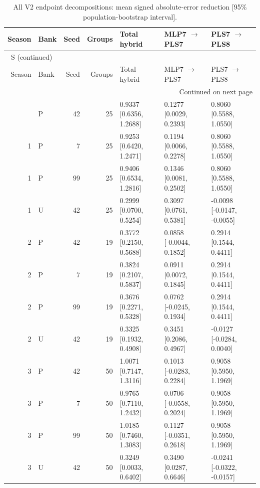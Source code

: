 \documentclass[10pt,a4paper]{article}
\renewcommand{\thetable}{S\arabic{table}}
\begin{document}
\clearpage
\begin{landscape}
\begingroup\footnotesize
\setlength{\tabcolsep}{3.5pt}
\renewcommand{\arraystretch}{1.10}
\begin{longtable}{rlrrlll}
\caption{All V2 endpoint decompositions: mean signed absolute-error reduction [95\% population-bootstrap interval].}\label{tab:endpoint}\\
\toprule
Season & Bank & Seed & Groups & Total hybrid & MLP7 $\rightarrow$ PLS7 & PLS7 $\rightarrow$ PLS8 \\
\midrule
\endfirsthead
\multicolumn{7}{l}{\tablename~\thetable{} (continued)}\\
\toprule
Season & Bank & Seed & Groups & Total hybrid & MLP7 $\rightarrow$ PLS7 & PLS7 $\rightarrow$ PLS8 \\
\midrule
\endhead
\midrule
\multicolumn{7}{r}{Continued on next page}\\
\endfoot
\bottomrule
\endlastfoot
1 & P & 42 & 25 & 0.9337 [0.6356, 1.2688] & 0.1277 [0.0029, 0.2393] & 0.8060 [0.5588, 1.0550] \\
1 & P & 7 & 25 & 0.9253 [0.6420, 1.2471] & 0.1194 [0.0066, 0.2278] & 0.8060 [0.5588, 1.0550] \\
1 & P & 99 & 25 & 0.9406 [0.6534, 1.2816] & 0.1346 [0.0081, 0.2502] & 0.8060 [0.5588, 1.0550] \\
1 & U & 42 & 25 & 0.2999 [0.0700, 0.5254] & 0.3097 [0.0761, 0.5381] & -0.0098 [-0.0147, -0.0055] \\
2 & P & 42 & 19 & 0.3772 [0.2150, 0.5688] & 0.0858 [-0.0044, 0.1852] & 0.2914 [0.1544, 0.4411] \\
2 & P & 7 & 19 & 0.3824 [0.2107, 0.5837] & 0.0911 [0.0072, 0.1845] & 0.2914 [0.1544, 0.4411] \\
2 & P & 99 & 19 & 0.3676 [0.2271, 0.5328] & 0.0762 [-0.0245, 0.1934] & 0.2914 [0.1544, 0.4411] \\
2 & U & 42 & 19 & 0.3325 [0.1932, 0.4908] & 0.3451 [0.2086, 0.4967] & -0.0127 [-0.0284, 0.0040] \\
3 & P & 42 & 50 & 1.0071 [0.7147, 1.3116] & 0.1013 [-0.0283, 0.2284] & 0.9058 [0.5950, 1.1969] \\
3 & P & 7 & 50 & 0.9765 [0.7110, 1.2432] & 0.0706 [-0.0558, 0.2024] & 0.9058 [0.5950, 1.1969] \\
3 & P & 99 & 50 & 1.0185 [0.7460, 1.3083] & 0.1127 [-0.0351, 0.2618] & 0.9058 [0.5950, 1.1969] \\
3 & U & 42 & 50 & 0.3249 [0.0033, 0.6402] & 0.3490 [0.0287, 0.6646] & -0.0241 [-0.0322, -0.0157] \\
\end{longtable}
\endgroup
\end{landscape}
\end{document}
